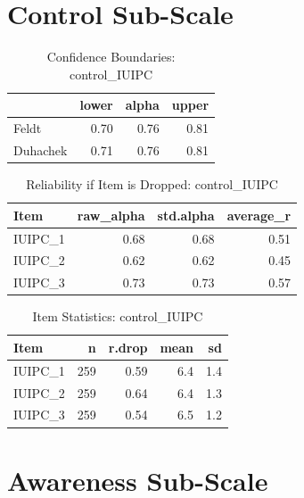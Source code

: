 \section{Control Sub-Scale}\label{control_IUIPC}

\begin{table}[h]
\centering
\small
\caption{Confidence Boundaries: control\_IUIPC}
\label{tab:control_confidence}
\begin{tabular}{lrrr}
\toprule
 & \textbf{lower} & \textbf{alpha} & \textbf{upper} \\
\midrule
Feldt     & 0.70 & 0.76 & 0.81 \\
Duhachek  & 0.71 & 0.76 & 0.81 \\
\bottomrule
\end{tabular}
\end{table}

\begin{table}[h]
\centering
\small
\caption{Reliability if Item is Dropped: control\_IUIPC}
\label{tab:control_dropped}
\begin{tabular}{lrrr}
\toprule
\textbf{Item} & \textbf{raw\_alpha} & \textbf{std.alpha} & \textbf{average\_r} \\
\midrule
IUIPC\_1 & 0.68 & 0.68 & 0.51 \\
IUIPC\_2 & 0.62 & 0.62 & 0.45 \\
IUIPC\_3 & 0.73 & 0.73 & 0.57 \\
\bottomrule
\end{tabular}
\end{table}

\begin{table}[h]
\centering
\small
\caption{Item Statistics: control\_IUIPC}
\label{tab:control_items}
\begin{tabular}{lrrrr}
\toprule
\textbf{Item} & \textbf{n} & \textbf{r.drop} & \textbf{mean} & \textbf{sd} \\
\midrule
IUIPC\_1 & 259 & 0.59 & 6.4 & 1.4 \\
IUIPC\_2 & 259 & 0.64 & 6.4 & 1.3 \\
IUIPC\_3 & 259 & 0.54 & 6.5 & 1.2 \\
\bottomrule
\end{tabular}
\end{table}


\section{Awareness Sub-Scale} \label{awareness_IUIPC}

